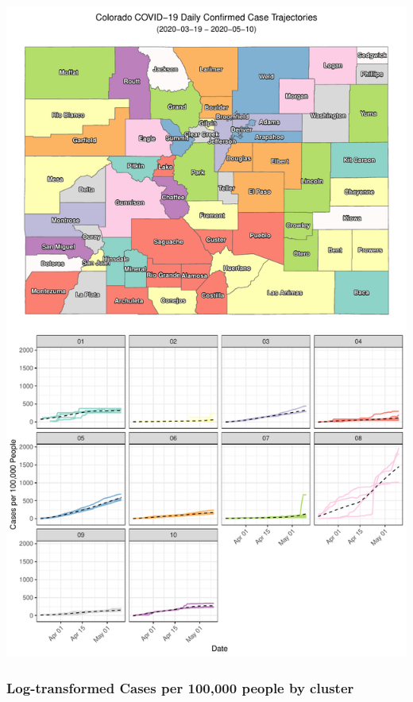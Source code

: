 \documentclass[]{article}
\begin{document}
\includegraphics{figs/county-clusters-raw-1.pdf}

\hypertarget{log-transformed-cases-per-100000-people-by-cluster}{%
\subsubsection{Log-transformed Cases per 100,000 people by
cluster}\label{log-transformed-cases-per-100000-people-by-cluster}}
\end{document}
